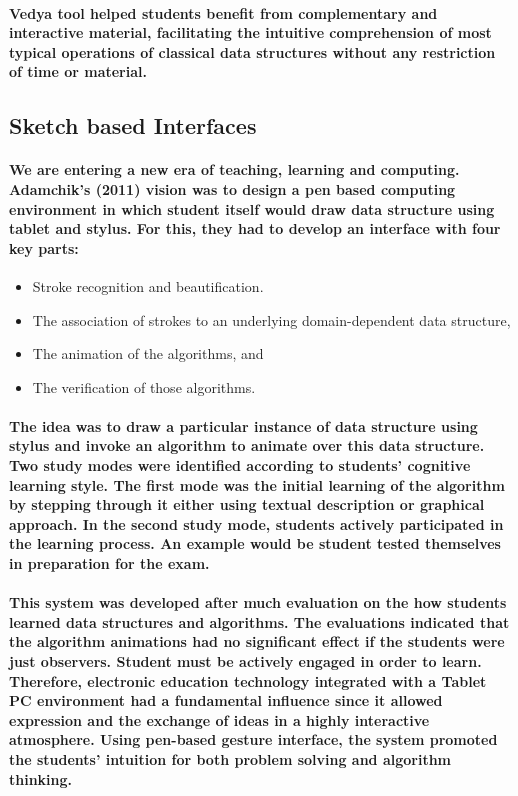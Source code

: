 \documentclass{article}
\begin{document}
\paragraph{\cite{patel2014literature}Vedya tool helped students benefit from complementary and interactive material, facilitating the intuitive comprehension of most typical operations of classical data structures without any restriction of time or material.}

\subsection{ Sketch based Interfaces}
\paragraph{ We are entering a new era of teaching, learning and computing. Adamchik's (2011)\cite{hammond2015impact} vision was to design a pen based computing environment in which student itself would draw data structure using tablet and stylus. For this, they had to develop an interface with four key parts: }
 \begin{itemize}
 \item Stroke recognition and beautification.
 \item The association of strokes to an underlying domain-dependent data structure,
 \item The animation of the algorithms, and 
 \item The verification of those algorithms.
 
\end{itemize}
 \paragraph{The idea was to draw a particular instance of data structure using stylus and invoke an algorithm to animate over this data structure. Two study modes were identified according to students' cognitive learning style. The first mode was the initial learning of the algorithm by stepping through it either using textual description or graphical approach. In the second study mode, students actively participated in the learning process. An example would be student tested themselves in preparation for the exam. }
\paragraph{This system was developed after much evaluation on the how students learned data structures and algorithms. The evaluations indicated that the algorithm animations had no significant effect if the students were just observers. Student must be actively engaged in order to learn. Therefore, electronic education technology integrated with a Tablet PC environment had a fundamental influence since it allowed expression and the exchange of ideas in a highly interactive atmosphere. Using pen-based gesture interface, the system promoted the students' intuition for both problem solving and algorithm thinking\cite{myller2009extending}. }
\newpage
\end{document}
